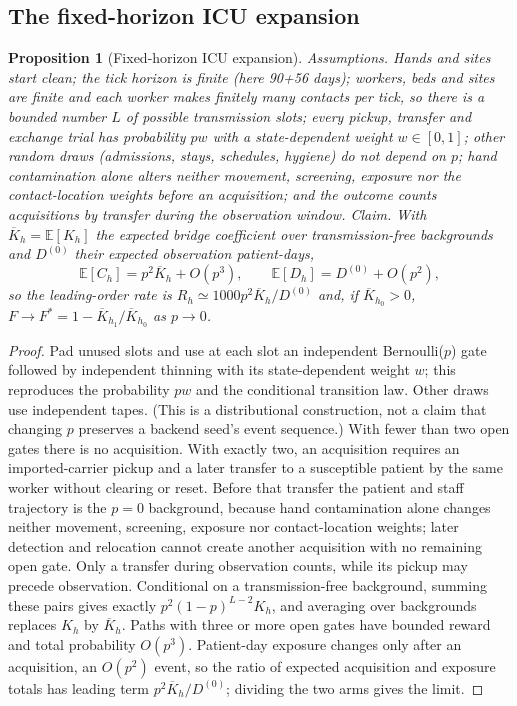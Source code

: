 \documentclass[11pt]{article}
\newtheorem{proposition}{Proposition}
\newcommand{\E}{\mathbb E}
\begin{document}
\subsection{The fixed-horizon ICU expansion}\label{sec:s-proof-icu}
\begin{proposition}[Fixed-horizon ICU expansion]\label{prop:icu}
\emph{Assumptions.} Hands and sites start clean; the tick horizon is finite (here
90+56 days); workers, beds and sites are finite and each worker makes finitely
many contacts per tick, so there is a bounded number $L$ of possible transmission
slots; every pickup, transfer and exchange trial has probability $pw$ with a
state-dependent weight $w\in[0,1]$; other random draws (admissions, stays,
schedules, hygiene) do not depend on $p$; hand contamination alone alters neither movement, screening, exposure nor the
contact-location weights before an acquisition; and the outcome counts acquisitions by
transfer during the observation window. \emph{Claim.} With $\overline K_h=\E[K_h]$
the expected bridge coefficient over transmission-free backgrounds and $D^{(0)}$
their expected observation patient-days,
\begin{equation}
\E[C_h]=p^2\overline K_h+O(p^3),\qquad \E[D_h]=D^{(0)}+O(p^2),
\end{equation}
so the leading-order rate is $R_h\simeq1000p^2\overline K_h/D^{(0)}$ and, if
$\overline K_{h_0}>0$, $F\to F^*=1-\overline K_{h_1}/\overline K_{h_0}$ as $p\to0$.
\end{proposition}
\begin{proof}
Pad unused slots and use at each slot an independent Bernoulli($p$) gate followed
by independent thinning with its state-dependent weight $w$; this reproduces the
probability $pw$ and the conditional transition law. Other draws use independent
tapes. (This is a distributional construction, not a claim that changing $p$
preserves a backend seed's event sequence.) With fewer than two open gates there
is no acquisition. With exactly two, an acquisition requires an imported-carrier
pickup and a later transfer to a susceptible patient by the same worker without
clearing or reset. Before that transfer the patient and staff trajectory is the
$p=0$ background, because hand contamination alone changes neither movement, screening,
exposure nor contact-location weights; later detection and relocation cannot create another acquisition with
no remaining open gate. Only a transfer during observation counts, while its
pickup may precede observation. Conditional on a transmission-free background,
summing these pairs gives exactly $p^2(1-p)^{L-2}K_h$, and averaging over
backgrounds replaces $K_h$ by $\overline K_h$. Paths with three or more open gates
have bounded reward and total probability $O(p^3)$. Patient-day exposure changes
only after an acquisition, an $O(p^2)$ event, so the ratio of expected acquisition
and exposure totals has leading term $p^2\overline K_h/D^{(0)}$; dividing the two
arms gives the limit.
\end{proof}
\end{document}
